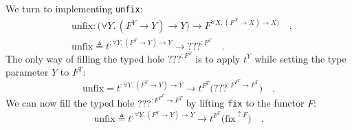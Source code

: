 We turn to implementing \lstinline!unfix!:
\begin{align*}
 & \text{unfix}:\big(\forall Y.\,(F^{Y}\rightarrow Y)\rightarrow Y\big)\rightarrow F^{\forall X.\,(F^{X}\rightarrow X)\rightarrow X\big)}\quad,\\
 & \text{unfix}\triangleq t^{:\forall Y.\,(F^{Y}\rightarrow Y)\rightarrow Y}\rightarrow\text{???}^{:F^{T}}\quad.
\end{align*}
The only way of filling the typed hole $\text{???}^{:F^{T}}$ is to
apply $t^{Y}$ while setting the type parameter $Y$ to $F^{T}$:
\[
\text{unfix}=t^{:\forall Y.\,(F^{Y}\rightarrow Y)\rightarrow Y}\rightarrow t^{F^{T}}\big(\text{???}^{:F^{F^{T}}\rightarrow F^{T}}\big)\quad.
\]
We can now fill the typed hole $\text{???}^{:F^{F^{T}}\rightarrow F^{T}}$
by lifting \lstinline!fix! to the functor $F$:
\begin{equation}
\text{unfix}\triangleq t^{:\forall Y.\,(F^{Y}\rightarrow Y)\rightarrow Y}\rightarrow t^{F^{T}}\big(\text{fix}^{\uparrow F}\big)\quad.\label{eq:definition-of-unfix}
\end{equation}

